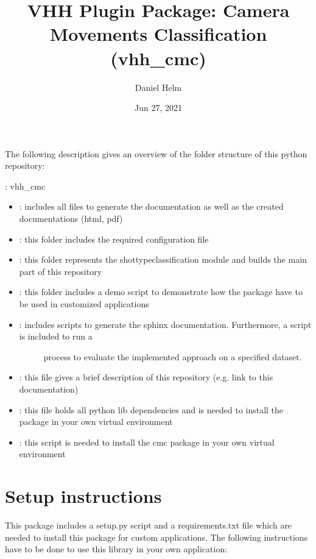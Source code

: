 \documentclass[letterpaper,10pt,english,openany,oneside]{sphinxmanual}
\title{VHH Plugin Package: Camera Movements Classification (vhh\_cmc)}
\date{Jun 27, 2021}
\author{Daniel Helm}
\begin{document}
\pagestyle{empty}
\sphinxmaketitle
\pagestyle{plain}
\sphinxtableofcontents
\pagestyle{normal}
\label{\detokenize{index::doc}}


The following description gives an overview of the folder structure of this python repository:

: vhh\_cmc
\begin{itemize}
\item {} 
: includes all files to generate the documentation as well as the created documentations (html, pdf)

\item {} 
: this folder includes the required configuration file

\item {} 
: this folder represents the shot\sphinxhyphen{}type\sphinxhyphen{}classification module and builds the main part of this repository

\item {} 
: this folder includes a demo script to demonstrate how the package have to be used in customized applications

\item {} \begin{description}
\item[{: includes scripts to generate the sphinx documentation. Furthermore, a script is included to run a}] \leavevmode
process to evaluate the implemented approach on a specified dataset.

\end{description}

\item {} 
: this file gives a brief description of this repository (e.g. link to this documentation)

\item {} 
: this file holds all python lib dependencies and is needed to install the package in your own virtual environment

\item {} 
: this script is needed to install the cmc package in your own virtual environment

\end{itemize}


\chapter{Setup  instructions}
\label{\detokenize{index:setup-instructions}}
This package includes a setup.py script and a requirements.txt file which are needed to install this package for custom
applications. The following instructions have to be done to use this library in your own application:
\end{document}

